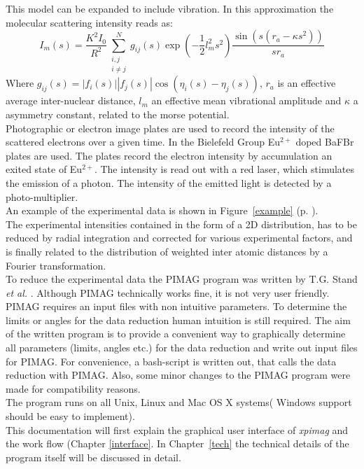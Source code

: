 This model can be expanded to include vibration. In this approximation the molecular scattering intensity reads as: 
\begin{equation*}
I_m(s) = \frac{K^2I_0}{R^2} \sum^N_{ \substack{i,j \\ i\neq j}}g_{ij}(s) \exp \left( -\frac{1}{2} l_m^2s^2 \right) \frac{\sin( s(r_a - \kappa s^2))}{sr_a}
\end{equation*}
 Where $g_{ij}(s) = |f_i(s)||f_j(s)|\cos(\eta_i(s) - \eta_j(s))$, $r_a$ is an effective average inter-nuclear distance, $l_m$ an effective mean vibrational amplitude and $\kappa$ a asymmetry constant, related to the morse potential. \\
 Photographic or electron image plates are used to record the intensity of the scattered electrons over a given time. In the Bielefeld Group Eu$^{2+}$ doped BaFBr plates are used. The plates record the electron intensity by accumulation an exited state of Eu$^{2+}$. The intensity is read out with a red laser, which stimulates the emission of a photon. The intensity of the emitted light is detected by a photo-multiplier.  \\
An example of the experimental data is shown in Figure~\ref{example} (p. \pageref{example}).\\
The experimental intensities contained in the form of a 2D distribution, has to be reduced by radial integration and corrected for various experimental factors, and is finally related to the distribution of weighted inter atomic distances by a Fourier transformation. \cite{gedbook}\\
To reduce the experimental data the PIMAG program was written by  T.G. Stand \textit{et al.} \cite{pimag}. Although PIMAG technically works fine, it is not very user friendly. PIMAG requires an input files with non intuitive parameters.  To determine the limits or angles for the data reduction human intuition is still required. The aim of the written program is to provide a convenient way to graphically determine all parameters (limits, angles etc.) for the data reduction and write out input files for PIMAG. For convenience, a bash-script is written out, that calls the data reduction with PIMAG. Also, some minor changes to the PIMAG program were made for compatibility reasons. \\
The program runs on all Unix, Linux and Mac OS X systems( Windows support should be easy to implement). \\
This documentation will first explain the graphical user interface of \textit{xpimag} and the work flow (Chapter \ref{interface}. In Chapter~\ref{tech} the technical details of the program itself will be discussed in detail. 
 
